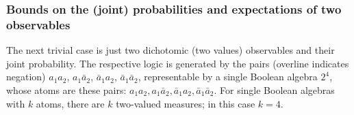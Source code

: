 
\subsubsection*{Bounds on the (joint) probabilities and expectations of two observables}

The next trivial case is just two dichotomic (two values) observables and their joint probability.
The respective logic is generated by the pairs   (overline indicates negation)
$a_1a_2$,
$a_1\bar{a}_2$,
$\bar{a}_1a_2$,
$\bar{a}_1\bar{a}_2$,
representable by a single Boolean algebra $2^4$, whose atoms are these pairs:
$a_1a_2,a_1\bar{a}_2,\bar{a}_1a_2,\bar{a}_1\bar{a}_2$.
For single Boolean algebras with $k$ atoms, there are $k$ two-valued measures; in this case $k=4$.

